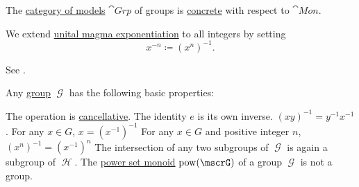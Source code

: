 \begin{definition}
\begin{thmenum}
     The \hyperref[def:category_of_small_first_order_models]{category of models} \( \cat{Grp} \) of groups is \hyperref[def:concrete_category]{concrete} with respect to \hyperref[def:unital_magma/associative]{\( \cat{Mon} \)}.

     We extend \hyperref[def:unital_magma/exponentiation]{unital magma exponentiation} to all integers by setting
    \begin{equation*}
      x^{-n} \coloneqq (x^n)^{-1}.
    \end{equation*}

    See .
  \end{thmenum}
\end{definition}

\begin{proposition}\label{thm:group_properties}
  Any \hyperref[def:group]{group} \( \mscrG \) has the following basic properties:
  \begin{thmenum}
     The operation is \hyperref[def:magma/cancellative]{cancellative}.
     The identity \( e \) is its own inverse.
     \( (xy)^{-1} = y^{-1} x^{-1} \).
     For any \( x \in G \), \( x = (x^{-1})^{-1} \)
     For any \( x \in G \) and positive integer \( n \), \( (x^n)^{-1} = (x^{-1})^n \)
     The intersection of any two subgroups of \( \mscrG \) is again a subgroup of \( \mscrH \).
     The \hyperref[def:magma/power_set]{power set monoid} \( \pow(\mscrG) \) of a group \( \mscrG \) is not a group.
  \end{thmenum}
\end{proposition}
